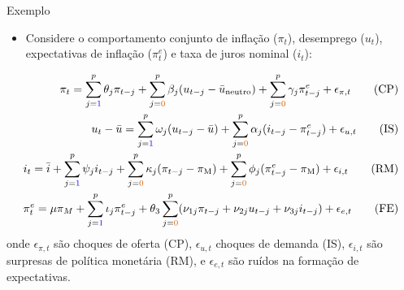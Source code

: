 \documentclass[11pt]{beamer}
\begin{document}
\begin{frame}{Exemplo}
	\begin{itemize}
			\item Considere o comportamento conjunto de inflação ($\pi_t$), desemprego ($u_t$), expectativas de inflação ($\pi^e_t$) e taxa de juros nominal ($i_t$):
	\end{itemize}
			\begin{align}
		\pi_t = \sum_{j={\color{blue}1}}^p \theta_j \pi_{t-j} + \sum_{j={\color{red}0}}^p \beta_j (u_{t-j}-\bar{u}_{\text{neutro}}) + \sum_{j={\color{red}0}}^p \gamma_j \pi_{t-j}^e + \epsilon_{\pi,t} \tag{CP} \\
		u_t - \bar{u} = \sum_{j={\color{blue}1}}^p \omega_j (u_{t-j}-\bar{u}) + \sum_{j={\color{red}0}}^p \alpha_j (i_{t-j} - \pi^e_{t-j})  + \epsilon_{u,t} \tag{IS} \\  i_t = \bar{i} + \sum_{j={\color{blue}1}}^p \psi_j i_{t-j} + \sum_{j={\color{red}0}}^p \kappa_j (\pi_{t-j}-\pi_{\text{M}}) + \sum_{j={\color{red}0}}^p \phi_j (\pi_{t-j}^e-\pi_{\text{M}}) + \epsilon_{i,t}\tag{RM}\\
		\pi^e_t = \mu \pi_{M} +  \sum_{j={\color{blue}1}}^p \iota_j \pi^e_{t-j} + \theta_3 \sum_{j={\color{red}0}}^p (\nu_{1j} \pi_{t-j} + \nu_{2j} u_{t-j} + \nu_{3j} i_{t-j}) + \epsilon_{e,t} \tag{FE}
	\end{align}
	onde $\epsilon_{\pi,t}$ são choques de oferta (CP), $\epsilon_{u,t}$ choques de demanda (IS), $\epsilon_{i,t}$ são surpresas de política monetária (RM), e $\epsilon_{e,t}$ são ruídos na formação de expectativas.

\end{frame}
\end{document}
